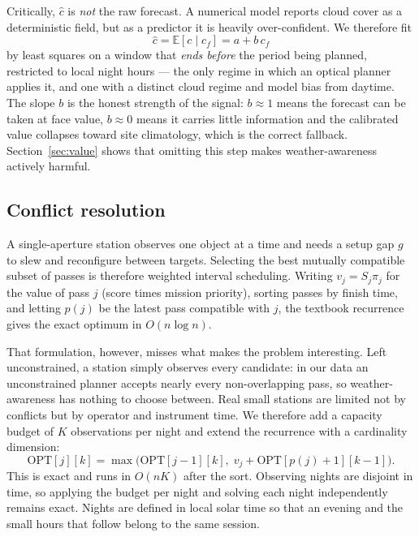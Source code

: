 \documentclass[conference]{IEEEtran}
\begin{document}
Critically, $\hat{c}$ is \emph{not} the raw forecast. A numerical model reports
cloud cover as a deterministic field, but as a predictor it is heavily
over-confident. We therefore fit
\begin{equation}
\hat{c} = \mathbb{E}[c \mid c_f] = a + b\,c_f
\label{eq:calib}
\end{equation}
by least squares on a window that \emph{ends before} the period being planned,
restricted to local night hours --- the only regime in which an optical planner
applies it, and one with a distinct cloud regime and model bias from daytime.
The slope $b$ is the honest strength of the signal: $b \approx 1$ means the
forecast can be taken at face value, $b \approx 0$ means it carries little
information and the calibrated value collapses toward site climatology, which is
the correct fallback. Section~\ref{sec:value} shows that omitting this step makes
weather-awareness actively harmful.

\subsection{Conflict resolution}
\label{sec:sched}
A single-aperture station observes one object at a time and needs a setup gap
$g$ to slew and reconfigure between targets. Selecting the best mutually
compatible subset of passes is therefore weighted interval scheduling. Writing
$v_j = S_j \pi_j$ for the value of pass $j$ (score times mission priority),
sorting passes by finish time, and letting $p(j)$ be the latest pass compatible
with $j$, the textbook recurrence~\cite{cormen2022introduction} gives the exact
optimum in $O(n\log n)$.

That formulation, however, misses what makes the problem interesting. Left
unconstrained, a station simply observes every candidate: in our data an
unconstrained planner accepts nearly every non-overlapping pass, so
weather-awareness has nothing to choose between. Real small stations are limited
not by conflicts but by operator and instrument time. We therefore add a
capacity budget of $K$ observations per night and extend the recurrence with a
cardinality dimension:
\begin{equation}
\mathrm{OPT}[j][k] = \max\bigl(\mathrm{OPT}[j\!-\!1][k],\;
      v_j + \mathrm{OPT}[p(j)\!+\!1][k\!-\!1]\bigr).
\label{eq:dp}
\end{equation}
This is exact and runs in $O(nK)$ after the sort. Observing nights are disjoint
in time, so applying the budget per night and solving each night independently
remains exact. Nights are defined in local solar time so that an evening and the
small hours that follow belong to the same session.
\end{document}
